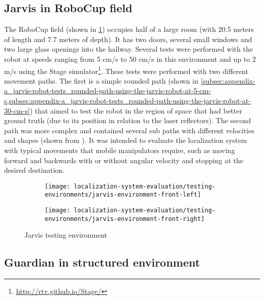 \subsection{Jarvis in RoboCup field}

The RoboCup field (shown in \cref{fig:localization-system-evaluation_jarvis-tests-environment}) occupies half of a large room (with 20.5 meters of length and 7.7 meters of depth). It has two doors, several small windows and two large glass openings into the hallway. Several tests were performed with the robot at speeds ranging from 5 cm/s to 50 cm/s in this environment and up to 2 m/s using the Stage simulator\footnote{\url{http://rtv.github.io/Stage/}}. These tests were performed with two different movement paths. The first is a simple rounded path (shown in \cref{subsec:appendix-a_jarvis-robot-tests_rounded-path-using-the-jarvis-robot-at-5-cm-s,subsec:appendix-a_jarvis-robot-tests_rounded-path-using-the-jarvis-robot-at-30-cm-s}) that aimed to test the robot in the region of space that had better ground truth (due to its position in relation to the laser reflectors). The second path was more complex and contained several sub paths with different velocities and shapes (shown from ). It was intended to evaluate the localization system with typical movements that mobile manipulators require, such as moving forward and backwards with or without angular velocity and stopping at the desired destination.


\begin{figure}[H]
	\centering
	\begin{subfigure}[h]{.497\textwidth}
		\centering
		\texttt{[image: localization-system-evaluation/testing-environments/jarvis-environment-front-left]}
	\end{subfigure}
	\begin{subfigure}[h]{.497\textwidth}
		\centering
		\texttt{[image: localization-system-evaluation/testing-environments/jarvis-environment-front-right]}
	\end{subfigure}
	\caption{Jarvis testing environment}
	\label{fig:localization-system-evaluation_jarvis-tests-environment}
\end{figure}


\subsection{Guardian in structured environment}

